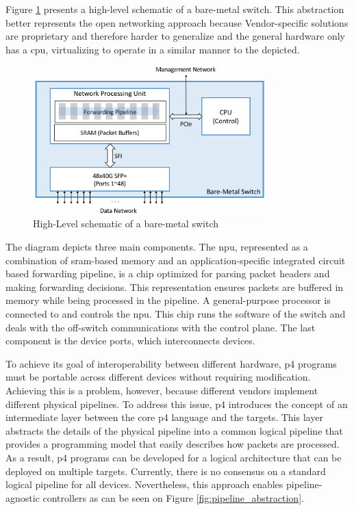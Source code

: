 Figure \ref{fig:switch_schematic} presents a high-level schematic of a bare-metal switch. This abstraction better represents the open networking approach because Vendor-specific solutions are proprietary and therefore harder to generalize and the general hardware only has a \gls{cpu}, virtualizing to operate in a similar manner to the depicted.

\begin{figure}
	\centering
	\includegraphics[width=0.8\textwidth]{Chapters/Figures/SDNs/switch_schematic.png}
	\caption{High-Level schematic of a bare-metal switch\cite{peterson_software-defined_2021}}
	\label{fig:switch_schematic}
\end{figure}

The diagram depicts three main components. The \gls{npu}, represented as a combination of \gls{sram}-based memory and an application-specific integrated circuit based forwarding pipeline, is a chip optimized for parsing packet headers and making forwarding decisions. This representation ensures packets are buffered in memory while being processed in the pipeline. A general-purpose processor is connected to and controls the \gls{npu}. This chip runs the software of the switch and deals with the off-switch communications with the control plane. The last component is the device ports, which interconnects devices.

To achieve its goal of interoperability between different hardware, \gls{p4} programs must be portable across different devices without requiring modification. Achieving this is a problem, however, because different vendors implement different physical pipelines. To address this issue, \gls{p4} introduces the concept of an intermediate layer between the core \gls{p4} language and the targets\cite{hauser_survey_2021}. This layer abstracts the details of the physical pipeline into a common logical pipeline that provides a programming model that easily describes how packets are processed. As a result, \gls{p4} programs can be developed for a logical architecture that can be deployed on multiple targets. Currently, there is no consensus on a standard logical pipeline for all devices. Nevertheless, this approach enables pipeline-agnostic controllers as can be seen on Figure \ref{fig:pipeline_abstraction}. 

